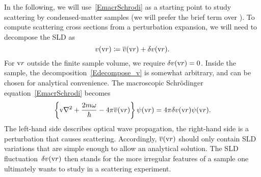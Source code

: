 In the following, we will use~\cref{EmacrSchrodi}
as a starting point to study scattering by condensed-matter samples
(we will prefer the brief term  over ).
%
%
To compute scattering cross sections from a perturbation expansion,
we will need to decompose the SLD as
\begin{equation}\label{Edecompose_v}
  v(\text{v}{r}) \coloneqq \overline{v}(\text{v}{r}) + \delta v(\text{v}{r}).
\end{equation}
%
%
For $\text{v}{r}$ outside the finite sample volume, we require $\delta v(\text{v}{r})=0$.
Inside the sample, the decomposition~\cref{Edecompose_v} is somewhat arbitrary,
and can be chosen for analytical convenience.
The macroscopic Schrödinger equation~\cref{EmacrSchrodi} becomes
\begin{equation}\label{ESchrodi3}
  \left\{ \text{v}{\nabla}^2 + \frac{2m\omega}{\hbar} - 4\pi\overline{v}(\text{v}{r}) \right\}\psi(\text{v}{r})
  = 4\pi\delta v(\text{v}{r})\psi(\text{v}{r}).
\end{equation}
The left-hand side describes optical wave propagation,
the right-hand side is a perturbation that causes scattering.
Accordingly, $\overline{v}(\text{v}{r})$ should only contain SLD variations
that are simple enough to allow an analytical solution.
The SLD fluctuation~$\delta v(\text{v}{r})$ then stands for the more irregular
features of a sample one ultimately wants to study in a scattering experiment.


